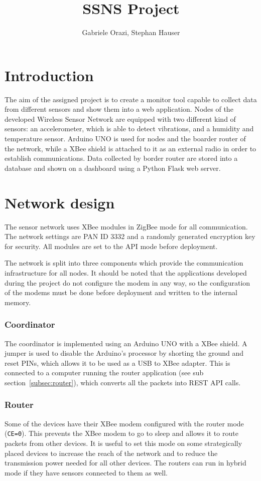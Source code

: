 \documentclass[a4paper,11pt]{scrartcl}
\title{SSNS Project}
\author{Gabriele Orazi, Stephan Hauser}
\begin{document}
\maketitle

\part{Introduction}
The aim of the assigned project is to create a monitor tool capable to collect data from different sensors and show them into a web application.
Nodes of the developed Wireless Sensor Network are equipped with two different kind of sensors: an accelerometer, which is able to detect vibrations, and a humidity and temperature sensor.
Arduino UNO is used for nodes and the boarder router of the network, while a XBee shield is attached to it as an external radio in order to establish communications.
Data collected by border router are stored into a database and shown on a dashboard using a Python Flask web server.

\part{Network design}
The sensor network uses XBee modules in ZigBee mode for all communication. The network settings are PAN ID 3332 and a randomly generated encryption key for security. All modules are set to the API mode before deployment.

The network is split into three components which provide the communication infrastructure for all nodes. It should be noted that the applications developed during the project do not configure the modem in any way, so the configuration of the modems must be done before deployment and written to the internal memory.

\section{Coordinator}\label{sec:coordinator}
The coordinator is implemented using an Arduino UNO with a XBee shield. A jumper is used to disable the Arduino's processor by shorting the ground and reset PINs, which allows it to be used as a USB to XBee adapter. This is connected to a computer running the router application (see sub section~\ref{subsec:router}), which converts all the packets into REST API calls.

\section{Router}
Some of the devices have their XBee modem configured with the router mode (\texttt{CE=0}). This prevents the XBee modem to go to sleep and allows it to route packets from other devices. It is useful to set this mode on some strategically placed devices to increase the reach of the network and to reduce the transmission power needed for all other devices. The routers can run in hybrid mode if they have sensors connected to them as well.
\end{document}
